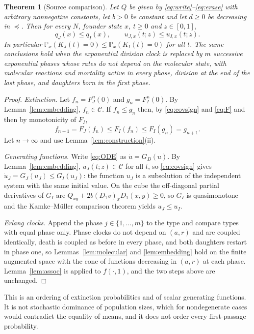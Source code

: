 \documentclass[11pt]{article}
\newtheorem{theorem}{Theorem}
\theoremstyle{remark}
\newcommand{\PP}{\mathbb P}
\begin{document}
\begin{theorem}[Source comparison]\label{thm:direction}
Let $Q$ be given by \eqref{eq:write}--\eqref{eq:erase} with arbitrary
nonnegative constants, let $b>0$ be constant and let $d\ge0$ be decreasing in
$\preceq$. Then for every $N$, founder state $x$, $t\ge0$ and $z\in[0,1]$,
\[
 q_J(x)\le q_I(x),\qquad u_{J,x}(t;z)\le u_{I,x}(t;z).
\]
In particular $\PP_x(K_J(t)=0)\le\PP_x(K_I(t)=0)$ for all $t$. The same
conclusions hold when the exponential division clock is replaced by $m$
successive exponential phases whose rates do not depend on the molecular
state, with molecular reactions and mortality active in every phase, division
at the end of the last phase, and daughters born in the first phase.
\end{theorem}
\begin{proof}
\emph{Extinction.} Let $f_n=F_J^n(0)$ and $g_n=F_I^n(0)$. By
Lemma~\ref{lem:embedding}, $f_n\in\mathcal C$. If $f_n\le g_n$ then, by
\eqref{eq:covsign} and \eqref{eq:F} and then by monotonicity of $F_I$,
\[
 f_{n+1}=F_J(f_n)\le F_I(f_n)\le F_I(g_n)=g_{n+1}.
\]
Let $n\to\infty$ and use Lemma~\ref{lem:construction}(ii).

\emph{Generating functions.} Write \eqref{eq:ODE} as $\dot u=G_D(u)$. By
Lemma~\ref{lem:embedding}, $u_J(t;z)\in\mathcal C$ for all $t$, so
\eqref{eq:covsign} gives
$\dot u_J=G_J(u_J)\le G_I(u_J)$: the function $u_J$ is a subsolution of the
independent system with the same initial value. On the cube the
off-diagonal partial derivatives of $G_I$ are
$Q_{xy}+2b(D_1v)_xD_1(x,y)\ge0$, so $G_I$ is quasimonotone and the
Kamke--M\"uller comparison theorem \cite[Ch.~3]{smith1995} yields
$u_J\le u_I$.

\emph{Erlang clocks.} Append the phase $j\in\{1,\dots,m\}$ to the type and
compare types with equal phase only. Phase clocks do not depend on $(a,r)$
and are coupled identically, death is coupled as before in every phase, and
both daughters restart in phase one, so Lemmas~\ref{lem:molecular} and
\ref{lem:embedding} hold on the finite augmented space with the cone of
functions decreasing in $(a,r)$ at each phase. Lemma~\ref{lem:assoc} is
applied to $f(\cdot,1)$, and the two steps above are unchanged.
\end{proof}

This is an ordering of extinction probabilities and of scalar generating
functions. It is not stochastic dominance of population sizes, which for
nondegenerate cases would contradict the equality of means, and it does not
order every first-passage probability.
\end{document}
